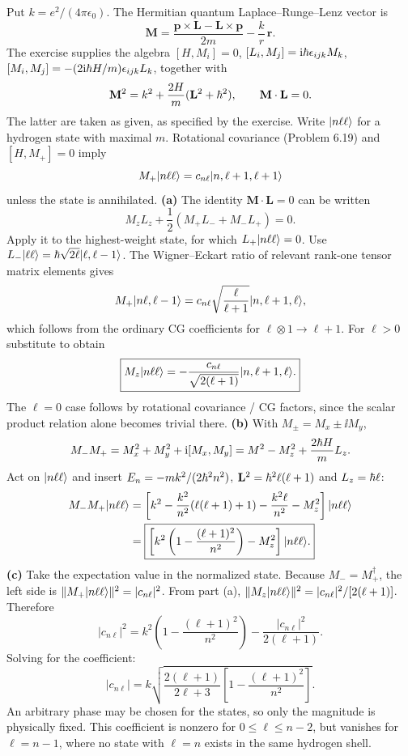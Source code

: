 Put $k=e^2/(4\pi\epsilon_0)$.
The Hermitian quantum
Laplace--Runge--Lenz vector is
\[
\mathbf M=\frac{\mathbf p\times\mathbf L-
\mathbf L\times\mathbf p}{2m}
-\frac{k}{r}\,\mathbf r.
\]
The exercise supplies the algebra
$[H,M_i]=0$, $[L_i,M_j]=
\mathrm i\hbar\epsilon_{ijk}M_k$,
$[M_i,M_j]=-(2\mathrm i\hbar H/m)
\epsilon_{ijk}L_k$, together with
\begin{equation}
\mathbf M^2=k^2+\frac{2H}{m}
(\mathbf L^2+\hbar^2),
\qquad\mathbf M\cdot\mathbf L=0.
\end{equation}
The latter are taken as given,
as specified by the exercise.
Write $\lvert n\ell\ell\rangle$ for a
hydrogen state with maximal $m$.
Rotational covariance (Problem 6.19)
and $[H,M_+]=0$ imply
\[
M_+\lvert n\ell\ell\rangle
=c_{n\ell}\lvert n,\ell+1,\ell+1\rangle
\]
unless the state is annihilated.
\textbf{(a)} The identity
$\mathbf M\cdot\mathbf L=0$ can be
written
\[
M_zL_z+\frac12(M_+L_-+M_-L_+)=0.
\]
Apply it to the highest-weight
state, for which $L_+\lvert n\ell\ell\rangle=0$.
Use $L_-\lvert \ell\ell\rangle
=\hbar\sqrt{2\ell}\lvert \ell,\ell-1\rangle$.
The Wigner--Eckart ratio of relevant
rank-one tensor matrix elements gives
\[
M_+\lvert n\ell,\ell-1\rangle
=c_{n\ell}\sqrt{\frac{\ell}{\ell+1}}
\lvert n,\ell+1,\ell\rangle,
\]
which follows from the ordinary
CG coefficients for $\ell\otimes1
\to\ell+1$.
For $\ell>0$ substitute to obtain
\begin{equation}
\boxed{M_z\lvert n\ell\ell\rangle
=-\frac{c_{n\ell}}{\sqrt{2(\ell+1)}}
\lvert n,\ell+1,\ell\rangle.}
\end{equation}
The $\ell=0$ case follows by
rotational covariance / CG factors,
since the scalar product relation
alone becomes trivial there.
\textbf{(b)} With
$M_\pm=M_x\pm\ii M_y$,
\[
M_-M_+=M_x^2+M_y^2+
\mathrm i[M_x,M_y]
=M^2-M_z^2+\frac{2\hbar H}{m}L_z.
\]
Act on $\lvert n\ell\ell\rangle$ and insert
$E_n=-mk^2/(2\hbar^2n^2)$,
$\mathbf L^2=\hbar^2\ell(\ell+1)$ and
$L_z=\hbar\ell$:
\begin{align}
M_-M_+\lvert n\ell\ell\rangle
&=\left[k^2-\frac{k^2}{n^2}
(\ell(\ell+1)+1)
-\frac{k^2\ell}{n^2}-M_z^2\right]
\lvert n\ell\ell\rangle\\
&=\boxed{\left[
k^2\left(1-\frac{(\ell+1)^2}{n^2}\right)
-M_z^2\right]\lvert n\ell\ell\rangle.}
\end{align}
\textbf{(c)} Take the expectation
value in the normalized state.
Because $M_-=M_+^\dagger$,
the left side is
$\|M_+\lvert n\ell\ell\rangle\|^2=|c_{n\ell}|^2$.
From part (a),
$\|M_z\lvert n\ell\ell\rangle\|^2=
|c_{n\ell}|^2/[2(\ell+1)]$.
Therefore
\[
|c_{n\ell}|^2=
k^2\left(1-\frac{(\ell+1)^2}{n^2}\right)
-\frac{|c_{n\ell}|^2}{2(\ell+1)}.
\]
Solving for the coefficient:
\begin{equation}
\boxed{|c_{n\ell}|=
k\sqrt{\frac{2(\ell+1)}{2\ell+3}
\left[1-\frac{(\ell+1)^2}{n^2}\right]}.}
\end{equation}
An arbitrary phase may be chosen
for the states, so only the magnitude
is physically fixed.
This coefficient is nonzero for
$0\le\ell\le n-2$, but vanishes
for $\ell=n-1$, where no state
with $\ell=n$ exists in the same
hydrogen shell.
